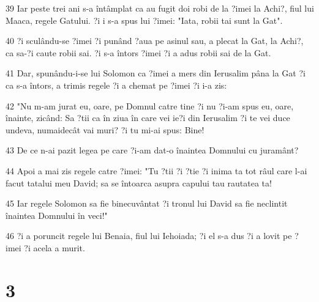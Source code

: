 \par 39 Iar peste trei ani s-a întâmplat ca au fugit doi robi de la ?imei la Achi?, fiul lui Maaca, regele Gatului. ?i i s-a spus lui ?imei: "Iata, robii tai sunt la Gat".
\par 40 ?i sculându-se ?imei ?i punând ?aua pe asinul sau, a plecat la Gat, la Achi?, ca sa-?i caute robii sai. ?i s-a întors ?imei ?i a adus robii sai de la Gat.
\par 41 Dar, spunându-i-se lui Solomon ca ?imei a mers din Ierusalim pâna la Gat ?i ca s-a întors, a trimis regele ?i a chemat pe ?imei ?i i-a zis:
\par 42 "Nu m-am jurat eu, oare, pe Domnul catre tine ?i nu ?i-am spus eu, oare, înainte, zicând: Sa ?tii ca în ziua în care vei ie?i din Ierusalim ?i te vei duce undeva, numaidecât vai muri? ?i tu mi-ai spus: Bine!
\par 43 De ce n-ai pazit legea pe care ?i-am dat-o înaintea Domnului cu juramânt?
\par 44 Apoi a mai zis regele catre ?imei: "Tu ?tii ?i ?tie ?i inima ta tot râul care l-ai facut tatalui meu David; sa se întoarca asupra capului tau rautatea ta!
\par 45 Iar regele Solomon sa fie binecuvântat ?i tronul lui David sa fie neclintit înaintea Domnului în veci!"
\par 46 ?i a poruncit regele lui Benaia, fiul lui Iehoiada; ?i el s-a dus ?i a lovit pe ?imei ?i acela a murit.

\chapter{3}


